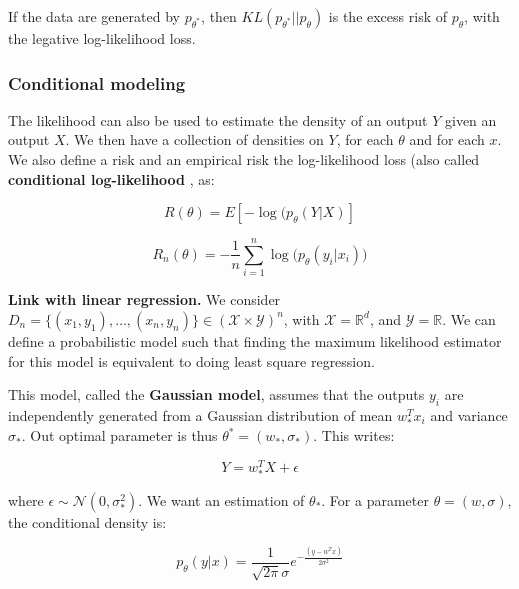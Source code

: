 \documentclass[
10pt, %
a4paper, %
oneside, %
headinclude,footinclude, %
BCOR5mm, %
]{scrartcl}
\begin{document}
\begin{lemma}
    
    If the data are generated by $p_{\theta^*}$, then $ KL(p_{\theta^*}||p_{\theta})$ is the excess risk of $p_{\theta}$, with the legative log-likelihood loss.
\end{lemma}

\subsubsection{\large\color{Periwinkle}Conditional modeling}

The likelihood can also be used to estimate the density of an output $Y$ given an output $X$. We then have a collection of densities on $Y$, for each $\theta$ and for each $x$. We also define a risk and an empirical risk the log-likelihood loss (also called \textbf{{conditional log-likelihood}} , as:

\begin{equation*}
    R(\theta) = E[-\log(p_{\theta}(Y|X)]
\end{equation*}

\begin{equation*}
    R_n(\theta) = - \frac{1}{n} \sum^{n}_{i=1} \log\big(p_{\theta}(y_i|x_i)\big)
\end{equation*}

\textbf{{Link with linear regression.}} We consider $D_n = \{(x_1, y_1), \dots, (x_n, y_n)\}\in (\mathcal{X}\times \mathcal{Y})^n$, with $ \mathcal{X} = \mathbb{R}^d$, and $ \mathcal{Y} = \mathbb{R} $. We can define a probabilistic model such that finding the maximum likelihood estimator for this model is equivalent to doing least square regression.

This model, called the \textbf{{Gaussian model}}, assumes that the outputs $y_i$ are independently generated from a Gaussian distribution of mean $w_*^Tx_i$ and variance $\sigma_*$. Out optimal parameter is thus $\theta^* =(w_*, \sigma_*)$. This writes:

\begin{equation*}
    Y = w_*^TX+\epsilon
\end{equation*}

where $\epsilon\sim \mathcal{N}(0, \sigma_*^2)$. We want an estimation of $\theta_*$. For a parameter $\theta=(w, \sigma)$, the conditional density is:

\begin{equation*}
    p_{\theta}(y|x) = \frac{1}{ \sqrt{2\pi} \sigma} e^{- \frac{(y-w^Tx)}{2\sigma^2} }
\end{equation*}
\end{document}

